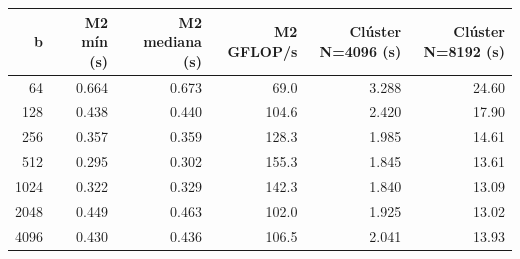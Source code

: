 \begin{tabular}{rrrrrr}
\toprule
b & M2 mín (s) & M2 mediana (s) & M2 GFLOP/s & Clúster N=4096 (s) & Clúster N=8192 (s) \\
\midrule
64 & 0.664 & 0.673 & 69.0 & 3.288 & 24.60 \\
128 & 0.438 & 0.440 & 104.6 & 2.420 & 17.90 \\
256 & 0.357 & 0.359 & 128.3 & 1.985 & 14.61 \\
512 & 0.295 & 0.302 & 155.3 & 1.845 & 13.61 \\
1024 & 0.322 & 0.329 & 142.3 & 1.840 & 13.09 \\
2048 & 0.449 & 0.463 & 102.0 & 1.925 & 13.02 \\
4096 & 0.430 & 0.436 & 106.5 & 2.041 & 13.93 \\
\bottomrule
\end{tabular}
